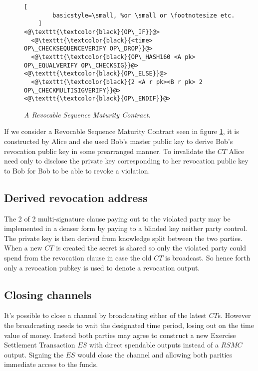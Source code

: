 \begin{figure}[hbt!]
	\centering
	\begin{lstlisting}[
		basicstyle=\small, %or \small or \footnotesize etc.
	]
<@\texttt{\textcolor{black}{OP\_IF}}@>
  <@\texttt{\textcolor{black}{<time> OP\_CHECKSEQUENCEVERIFY OP\_DROP}}@>
  <@\texttt{\textcolor{black}{OP\_HASH160 <A pk> OP\_EQUALVERIFY OP\_CHECKSIG}}@>
<@\texttt{\textcolor{black}{OP\_ELSE}}@>
  <@\texttt{\textcolor{black}{2 <A r pk><B r pk> 2 OP\_CHECKMULTISIGVERIFY}}@>
<@\texttt{\textcolor{black}{OP\_ENDIF}}@>
	\end{lstlisting}
	
	\caption{\textit{ A Revocable Sequence Maturity Contract.
	}}
	\label{fig:RSMC}
\end{figure}

If we consider a Revocable Sequence Maturity Contract seen in figure \ref{fig:RSMC}, it is constructed by Alice and she used Bob's master public key to derive Bob's revocation public key in some prearranged manner. To invalidate the $CT$ Alice need only to disclose the private key corresponding to her revocation public key to Bob for Bob to be able to revoke a violation. 

\subsection{Derived revocation address}

The 2 of 2 multi-signature clause paying out to the violated party may be implemented in a denser form by paying to a blinded key neither party control. The private key is then derived from knowledge split between the two parties. When a new $CT$ is created the secret is shared so only the violated party could spend from the revocation clause in case the old $CT$ is broadcast. So hence forth only a revocation pubkey is used to denote a revocation output.

\subsection{Closing channels}

It's possible to close a channel by broadcasting either of the latest $CT$s. However the broadcasting needs to wait the designated time period, losing out on the time value of money. Instead both parties may agree to construct a new Exercise Settlement Transaction $ES$ with direct spendable outputs instead of a $RSMC$ output. Signing the $ES$ would close the channel and allowing both parities immediate access to the funds.

